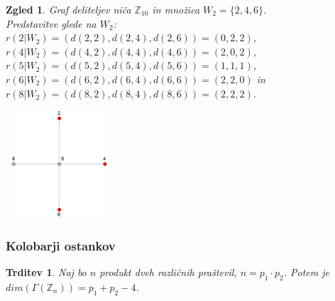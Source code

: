 \documentclass{beamer}
\def\Z{\mathbb{Z}} %
\newtheorem{trditev}{Trditev}
\newtheorem{zgled}{Zgled}
\begin{document}

\begin{frame}
    
    \begin{zgled}
        Graf deliteljev niča $\Z_{10}$ in množica $W_2 = \{2,4,6\}$.\\
        Predstavitve glede na $W_2$:\\
        $r(2|W_2)=( d(2,2), d(2,4), d(2,6) ) = ( 0, 2, 2 )$,
        $r(4|W_2)=( d(4,2), d(4,4), d(4,6) ) = ( 2, 0, 2 )$,
        $r(5|W_2)=( d(5,2), d(5,4), d(5,6) ) = ( 1, 1, 1 )$,
        $r(6|W_2)=( d(6,2), d(6,4), d(6,6) ) = ( 2, 2, 0 )$ in 
        $r(8|W_2)=( d(8,2), d(8,4), d(8,6) ) = ( 2, 2, 2 )$.
    \end{zgled}
    \begin{center}
        \includegraphics[width=4cm, height=4cm]{z10W2.png}
    \end{center}
    
\end{frame}



\begin{frame}
    \frametitle{Kolobarji ostankov}
    \begin{trditev}
        Naj bo $n$ produkt dveh različnih praštevil, $n = p_1 \cdot p_2$. Potem je 
        $dim(\Gamma(\Z_{n})) = p_1 + p_2 - 4$.
    \end{trditev}
    
\end{frame}
    
\end{document}
